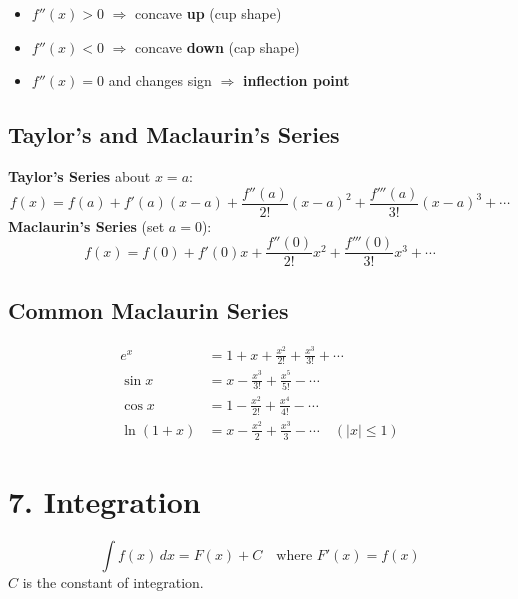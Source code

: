\documentclass[12pt]{article}
\begin{document}
\begin{itemize}[leftmargin=16pt]
  \item $f''(x) > 0$ $\Rightarrow$ concave \textbf{up} (cup shape)
  \item $f''(x) < 0$ $\Rightarrow$ concave \textbf{down} (cap shape)
  \item $f''(x) = 0$ and changes sign $\Rightarrow$ \textbf{inflection point}
\end{itemize}

\subsection{Taylor's and Maclaurin's Series}

\begin{formulabox}
\textbf{Taylor's Series} about $x = a$:
\[
  f(x) = f(a) + f'(a)(x-a) + \frac{f''(a)}{2!}(x-a)^2 + \frac{f'''(a)}{3!}(x-a)^3 + \cdots
\]
\textbf{Maclaurin's Series} (set $a=0$):
\[
  f(x) = f(0) + f'(0)x + \frac{f''(0)}{2!}x^2 + \frac{f'''(0)}{3!}x^3 + \cdots
\]
\end{formulabox}

\subsection{Common Maclaurin Series}

\begin{formulabox}
\begin{align*}
  e^x &= 1 + x + \frac{x^2}{2!} + \frac{x^3}{3!} + \cdots \\[6pt]
  \sin x &= x - \frac{x^3}{3!} + \frac{x^5}{5!} - \cdots \\[6pt]
  \cos x &= 1 - \frac{x^2}{2!} + \frac{x^4}{4!} - \cdots \\[6pt]
  \ln(1+x) &= x - \frac{x^2}{2} + \frac{x^3}{3} - \cdots \quad (|x| \leq 1)
\end{align*}
\end{formulabox}

\section{7. Integration}

\begin{defbox}
\[
  \int f(x)\,dx = F(x) + C \quad \text{where } F'(x) = f(x)
\]
$C$ is the constant of integration.
\end{defbox}
\end{document}
